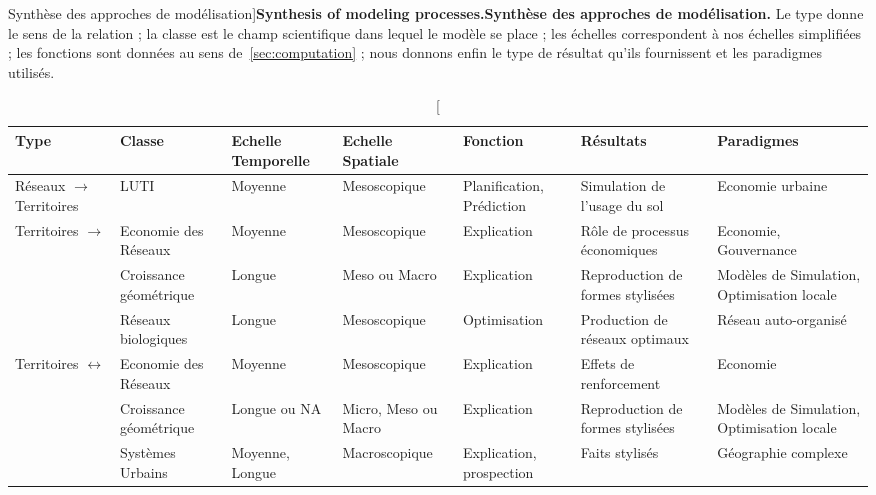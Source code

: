 \begin{table}%
\caption[Synthesis of modeling processes][Synthèse des approches de modélisation]{\textbf{Synthesis of modeling processes.}\label{tab:modelingsa:synthesis}}{\textbf{Synthèse des approches de modélisation.} Le type donne le sens de la relation ; la classe est le champ scientifique dans lequel le modèle se place ; les échelles correspondent à nos échelles simplifiées ; les fonctions sont données au sens de~\ref{sec:computation} ; nous donnons enfin le type de résultat qu'ils fournissent et les paradigmes utilisés.\label{tab:modelingsa:synthesis}}
\begin{tabular}{|p{2.5cm}|p{2cm}|p{2.5cm}|p{2.5cm}|p{2.1cm}|p{2.2cm}|p{2cm}|}
\hline
Type & Classe & Echelle Temporelle & Echelle Spatiale & Fonction & Résultats & Paradigmes\\ \hline
Réseaux $\rightarrow$ Territoires & LUTI & Moyenne & Mesoscopique & Planification, Prédiction & Simulation de l'usage du sol & Economie urbaine \\ \hline
\multirow{3}{*}{Territoires $\rightarrow$}& Economie des Réseaux & Moyenne & Mesoscopique & Explication & Rôle de processus économiques & Economie, Gouvernance\\\cline{2-7}
Réseaux& Croissance géométrique & Longue & Meso ou Macro & Explication & Reproduction de formes stylisées & Modèles de Simulation, Optimisation locale \\\cline{2-7}
& Réseaux biologiques & Longue & Mesoscopique & Optimisation & Production de réseaux optimaux & Réseau auto-organisé \\ \hline
\multirow{2}{*}{Territoires $\leftrightarrow$}& Economie des Réseaux & Moyenne & Mesoscopique & Explication & Effets de renforcement & Economie\\\cline{2-7}
Réseaux & Croissance géométrique & Longue ou NA & Micro, Meso ou Macro & Explication & Reproduction de formes stylisées & Modèles de Simulation, Optimisation locale \\\cline{2-7}
& Systèmes Urbains & Moyenne, Longue & Macroscopique & Explication, prospection & Faits stylisés & Géographie complexe\\\hline
\end{tabular}
\end{table}







